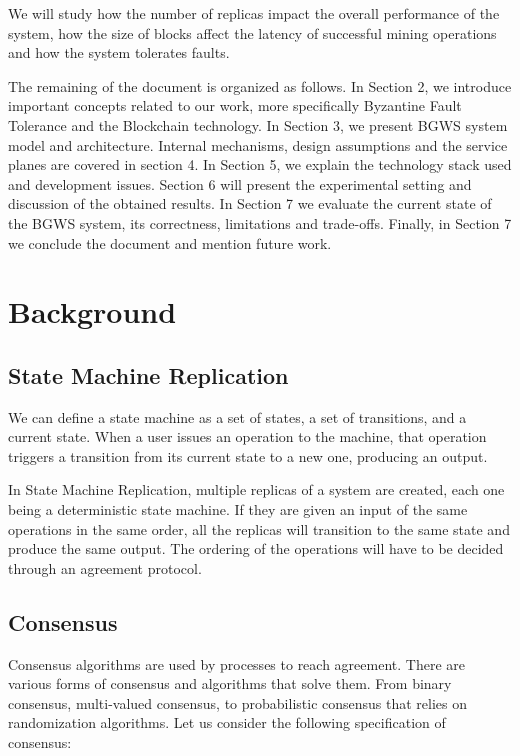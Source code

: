 \documentclass[10pt,journal,compsoc]{IEEEtran}
\begin{document}
	We will study how the number of replicas impact the overall performance of the system, how the size of blocks affect the latency of successful mining operations and how the system tolerates faults.
		
	The remaining of the document is organized as follows.
	In Section 2, we introduce important concepts related to our work, more specifically Byzantine Fault Tolerance and the Blockchain technology.
	In Section 3, we present BGWS system model and architecture.
	Internal mechanisms, design assumptions and the service planes are covered in section 4.
	In Section 5, we explain the technology stack used and development issues.
	Section 6 will present the experimental setting and discussion of the obtained results.
	In Section 7 we evaluate the current state of the BGWS system, its correctness, limitations and trade-offs.
	Finally, in Section 7 we conclude the document and mention future work.
	



	\section{Background}
	\subsection{State Machine Replication}
	We can define a state machine as a set of states, a set of transitions, and a current state. When a user issues an operation to the machine, that operation triggers a transition from its current state to a new one, producing an output. 

	In State Machine Replication, multiple replicas of a system are created, each one being a deterministic state machine. If they are given an input of the same operations in the same order, all the replicas will transition to the same state and produce the same output. The ordering of the operations will have to be decided through an agreement protocol. 

	\subsection{Consensus}
	Consensus algorithms are used by processes to reach agreement. There are various forms of consensus and algorithms that solve them\cite{lamport2001paxos}\cite{raft}. From binary consensus, multi-valued consensus, to probabilistic consensus that relies on randomization algorithms\cite{moniz2008ritas}\cite{moniz2006experimental}. Let us consider the following specification of consensus: 
\end{document}

